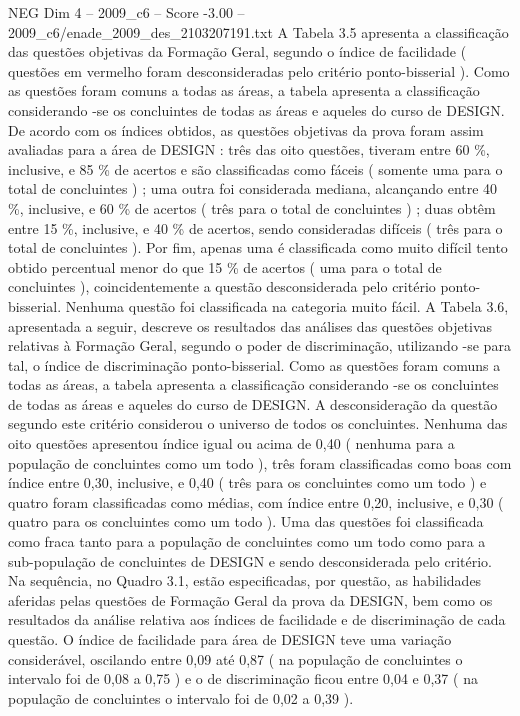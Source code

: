 \begin{textsample}{NEG Dim 4 – 2009\_c6 – Score -3.00 – 2009\_c6/enade\_2009\_des\_2103207191.txt}
A Tabela 3.5 apresenta a classificação das questões objetivas da Formação Geral, segundo o índice de facilidade ( questões em vermelho foram desconsideradas pelo critério ponto-bisserial ).
Como as questões foram comuns a todas as áreas, a tabela apresenta a classificação considerando -se os concluintes de todas as áreas e aqueles do curso de DESIGN.
De acordo com os índices obtidos, as questões objetivas da prova foram assim avaliadas para a área de DESIGN : três das oito questões, tiveram entre 60 \%, inclusive, e 85 \% de acertos e são classificadas como fáceis ( somente uma para o total de concluintes ) ; uma outra foi considerada mediana, alcançando entre 40 \%, inclusive, e 60 \% de acertos ( três para o total de concluintes ) ; duas obtêm entre 15 \%, inclusive, e 40 \% de acertos, sendo consideradas difíceis ( três para o total de concluintes ).
Por fim, apenas uma é classificada como muito difícil tento obtido percentual menor do que 15 \% de acertos ( uma para o total de concluintes ), coincidentemente a questão desconsiderada pelo critério ponto-bisserial.
Nenhuma questão foi classificada na categoria muito fácil.
A Tabela 3.6, apresentada a seguir, descreve os resultados das análises das questões objetivas relativas à Formação Geral, segundo o poder de discriminação, utilizando -se para tal, o índice de discriminação ponto-bisserial.
Como as questões foram comuns a todas as áreas, a tabela apresenta a classificação considerando -se os concluintes de todas as áreas e aqueles do curso de DESIGN.
A desconsideração da questão segundo este critério considerou o universo de todos os concluintes.
Nenhuma das oito questões apresentou índice igual ou acima de 0,40 ( nenhuma para a população de concluintes como um todo ), três foram classificadas como boas com índice entre 0,30, inclusive, e 0,40 ( três para os concluintes como um todo ) e quatro foram classificadas como médias, com índice entre 0,20, inclusive, e 0,30 ( quatro para os concluintes como um todo ).
Uma das questões foi classificada como fraca tanto para a população de concluintes como um todo como para a sub-população de concluintes de DESIGN e sendo desconsiderada pelo critério.
Na sequência, no Quadro 3.1, estão especificadas, por questão, as habilidades aferidas pelas questões de Formação Geral da prova da DESIGN, bem como os resultados da análise relativa aos índices de facilidade e de discriminação de cada questão.
O índice de facilidade para área de DESIGN teve uma variação considerável, oscilando entre 0,09 até 0,87 ( na população de concluintes o intervalo foi de 0,08 a 0,75 ) e o de discriminação ficou entre 0,04 e 0,37 ( na população de concluintes o intervalo foi de 0,02 a 0,39 ).

\end{textsample}

